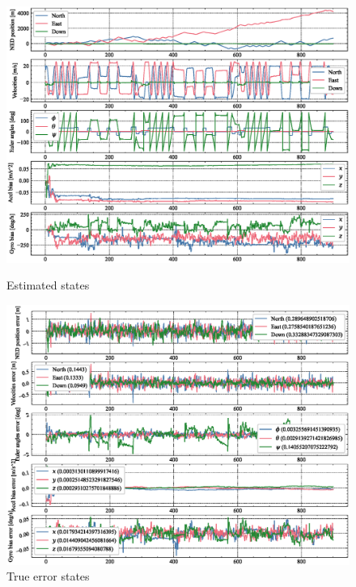 \begin{figure}
    \centering
    \includegraphics[clip, trim= 0cm 0cm 0cm 0cm, width = \textwidth]{figures/sim_2.eps}
    \caption{Estimated states}
	\label{fig:1_2}
	\includegraphics[clip, trim= 0cm 0cm 0cm 0cm, width = \textwidth]{figures/sim_3.eps}
    \caption{True error states}
	\label{fig:23states}
\end{figure}
